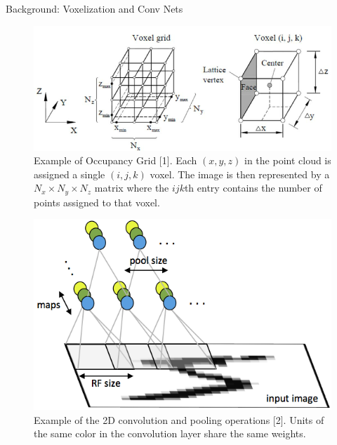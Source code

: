 \documentclass[final]{beamer}
\begin{document}
\begin{frame}{}
\begin{textblock}{24}
\begin{block}{Background: Voxelization and Conv Nets}
\begin{figure}
\begin{center}
\includegraphics[width=23cm]{voxelgrid.png}
\end{center}
\vspace{0.5em}
\caption{Example of Occupancy Grid [1]. Each $(x,y,z)$ in the point cloud is assigned a single $(i,j,k)$ voxel. The image is then represented by a $N_x\times N_y\times N_z$ matrix where the $ijk$th entry contains the number of points assigned to that voxel.}
\label{voxel}
\end{figure}
\begin{figure}
\begin{center}
\includegraphics[width=14cm]{convolution.png}
\end{center}
\vspace{0.5em}
\caption{Example of the 2D convolution and pooling operations [2]. Units of the same color in the convolution layer share the same weights.}
\end{figure}
\vspace{-0.5em}
\end{block}
\end{textblock}


\end{frame}
\end{document}
